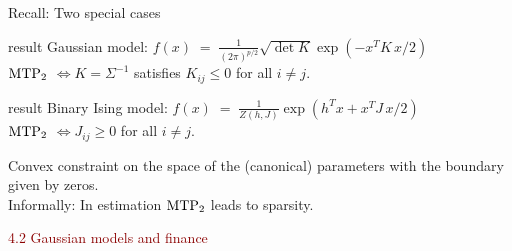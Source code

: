 \documentclass[dvipsnames,aspectratio=169]{beamer} %
\newcommand{\mtp}{{\rm MTP}_{2}}
\begin{document}
\begin{frame}{Recall: Two special cases}
\begin{beamercolorbox}[wd=\paperwidth,sep=5pt]{result}
	\alert{Gaussian model}: $f(x)\;=\;\tfrac{1}{(2\pi)^{p/2}}\sqrt{\det K}\exp(-x^T\!K\,x/2)$\\[.2cm]
$\mtp$ \quad$\Longleftrightarrow$\quad $K=\Sigma^{-1}$ satisfies $K_{ij}\leq 0$ for all $i\neq j$.
\end{beamercolorbox}
\medskip
\begin{beamercolorbox}[wd=\paperwidth,sep=5pt]{result}
	\alert{Binary Ising model}: $f(x)\;=\;\tfrac{1}{Z(h,J)}\exp(h^Tx+x^T\!J\,x/2)$\\[.2cm]
$\mtp$ \quad$\Longleftrightarrow$\quad $J_{ij}\geq 0$ for all $i\neq j$.
\end{beamercolorbox}

\bigskip
Convex constraint on the space of the (canonical) parameters with the boundary given by zeros. \\[.3cm]
Informally: In estimation $\mtp$ leads to sparsity.
\end{frame}


\begin{frame}{}
\begin{center}
	{\huge \textcolor{DarkRed}{4.2 Gaussian models and finance}}
\end{center}
\end{frame}
\end{document}
